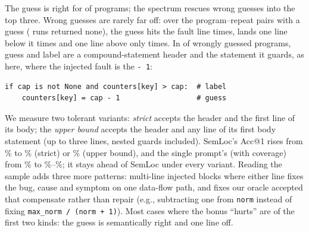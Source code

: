 The guess is right for \FailGuessRightN{} of \FailProgramsN{} programs; the spectrum rescues \FailRescuedBySpectrumN{} wrong
guesses into the top three. Wrong guesses are rarely far off: over the \OffLlmGuessTotal{} program--repeat pairs with a
guess (\OffLlmGuessMissing{} runs returned none), the guess hits the fault line \OffLlmGuessZeroCount{} times, lands one line
below it \OffLlmGuessOneCount{} times and one line above only \OffLlmGuessMinusOneCount{} times. In
\FailRelationHeaderBodyN{} of \FailWrongGuessN{} wrongly guessed programs, guess and label are a compound-statement header
and the statement it guards, as here, where the injected fault is the \texttt{- 1}:
\begin{lstlisting}[numbers=none]
if cap is not None and counters[key] > cap:  # label
    counters[key] = cap - 1                  # guess
\end{lstlisting}
We measure two tolerant variants: \emph{strict} accepts the header and the first line of its body; the \emph{upper
bound} accepts the header and any line of its first body statement (up to three lines, nested guards included). SemLoc's
Acc@1 rises from \TolSemlocAccOneExact\% to \TolSemlocAccOneGuardStrict\% (strict) or \TolSemlocAccOneGuardOrBody\% (upper
bound), and the single prompt's (with coverage) from \TolLlmCoverageAccOneExact\% to
\TolLlmCoverageAccOneGuardStrict\%--\TolLlmCoverageAccOneGuardOrBody\%; it stays ahead of SemLoc under every
variant. Reading the sample adds three more patterns: multi-line injected blocks where either line fixes the bug, cause
and symptom on one data-flow path, and fixes our oracle accepted that compensate rather than repair (e.g., subtracting one
from \texttt{norm} instead of fixing \texttt{max\_norm / (norm + 1)}). Most cases where the bonus ``hurts'' are of the first
two kinds: the guess is semantically right and one line off.
